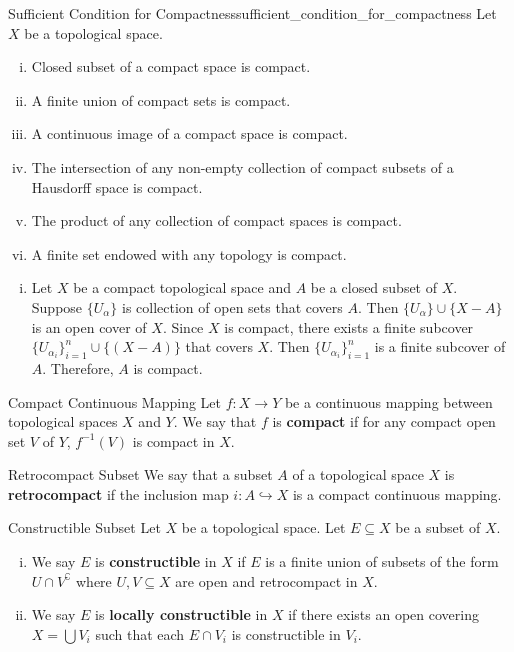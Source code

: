 \documentclass{report}
\begin{document}
\begin{proposition}{Sufficient Condition for Compactness}{sufficient_condition_for_compactness}
	Let $X$ be a topological space.
	\begin{enumerate}[(i)]
		\item Closed subset of a compact space is compact.
		\item A finite union of compact sets is compact.
		\item A continuous image of a compact space is compact.
		\item The intersection of any non-empty collection of compact subsets of a Hausdorff space is compact.
		\item The product of any collection of compact spaces is compact.
		\item A finite set endowed with any topology is compact.
	\end{enumerate}
\end{proposition}
\begin{prf}
	\begin{enumerate}[(i)]
	\item Let $X$ be a compact topological space and $A$ be a closed subset of $X$. Suppose $\{U_\alpha\}$ is collection of open sets that covers $A$. Then $\{U_\alpha\}\cup\{X-A\}$ is an open cover of $X$. Since $X$ is compact, there exists a finite subcover $\{U_{\alpha_i}\}_{i=1}^n \cup\{(X-A)\}$ that covers $X$. Then $\{U_{\alpha_i}\}_{i=1}^n$ is a finite subcover of $A$. Therefore, $A$ is compact.
	\end{enumerate}
\end{prf}

\begin{definition}{Compact Continuous Mapping}{}
	Let $f:X\to Y$ be a continuous mapping between topological spaces $X$ and $Y$. We say that $f$ is \textbf{compact} if for any compact open set $V$ of $Y$, $f^{-1}(V)$ is compact in $X$.
\end{definition}

\begin{definition}{Retrocompact Subset}{}
	We say that a subset $A$ of a topological space $X$ is \textbf{retrocompact} if the inclusion map $i:A\hookrightarrow X$ is a compact continuous mapping.
\end{definition}

\begin{definition}{Constructible Subset}{}
	Let $X$ be a topological space. Let $E \subseteq X$ be a subset of $X$.
	\begin{enumerate}[(i)]
		\item We say $E$ is \textbf{constructible} in $X$ if $E$ is a finite union of subsets of the form $U \cap V^{\complement}$ where $U, V \subseteq X$ are open and retrocompact in $X$.
		\item We say $E$ is \textbf{locally constructible} in $X$ if there exists an open covering $X=\bigcup V_i$ such that each $E \cap V_i$ is constructible in $V_i$.
	\end{enumerate}
\end{definition}
\end{document}
